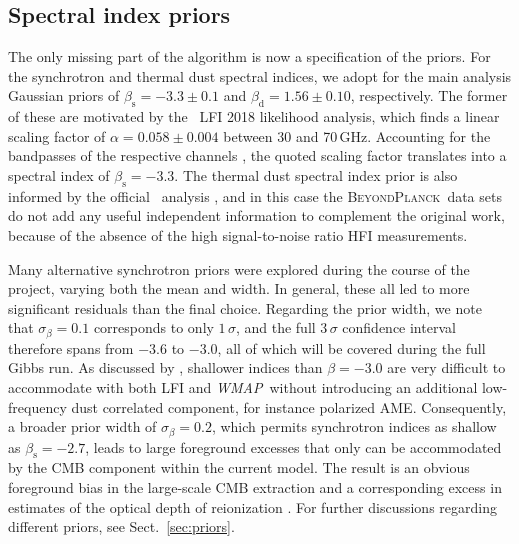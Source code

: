 \documentclass[twocolumn]{aa}
\def\WMAP{\textit{WMAP}}
\newcommand{\BP}{\textsc{BeyondPlanck}}
\newcommand{\?}[1]{\textcolor{red}{{\bf [#1]}}}
\begin{document}
\subsection{Spectral index priors}

The only missing part of the algorithm is now a specification of the
priors. For the synchrotron and thermal dust spectral indices, we
adopt for the main analysis Gaussian priors of
$\beta_{\mathrm{s}}=-3.3\pm0.1$ and $\beta_{\mathrm{d}}=1.56\pm0.10$,
respectively. The former of these are motivated by the \Planck\ LFI
2018 likelihood analysis, which finds a linear scaling factor of
$\alpha=0.058\pm0.004$ between 30 and 70\,GHz. Accounting for the
bandpasses of the respective channels \citep{planck2016-l02,bp09}, the
quoted scaling factor translates into a spectral index of
$\beta_{\mathrm{s}}=-3.3$. The thermal dust spectral index prior is
also informed by the official \Planck\ analysis
\citet{planck2014-a12}, and in this case the \BP\ data sets do not add
any useful independent information to complement the original work,
because of the absence of the high signal-to-noise ratio HFI
measurements.

Many alternative synchrotron priors were explored during the course of
the project, varying both the mean and width. In general, these all
led to more significant residuals than the final choice. Regarding the
prior width, we note that $\sigma_{\beta}=0.1$ corresponds to only
$1\,\sigma$, and the full $3\,\sigma$ confidence interval therefore
spans from $-3.6$ to $-3.0$, all of which will be covered during the
full Gibbs run. As discussed by \citet{bp15}, shallower indices than
$\beta=-3.0$ are very difficult to accommodate with both LFI and
\WMAP\ without introducing an additional low-frequency dust correlated
component, for instance polarized AME. Consequently, a broader prior
width of $\sigma_{\beta}=0.2$, which permits synchrotron indices as
shallow as $\beta_{\mathrm{s}}=-2.7$, leads to large foreground
excesses that only can be accommodated by the CMB component within
the current model. The result is an obvious foreground bias in the
large-scale CMB extraction and a corresponding excess in estimates of
the optical depth of reionization \citep{bp12}. For further
discussions regarding different priors, see Sect.~\ref{sec:priors}.
\end{document}
